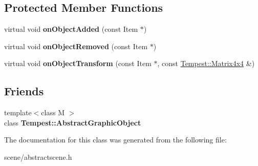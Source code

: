 \subsection*{Protected Member Functions}
\begin{DoxyCompactItemize}
\item 
\hypertarget{class_tempest_1_1_abstract_scene_a884fe6c22b0411cd2524ad56c479ab25}{virtual void {\bfseries on\+Object\+Added} (const Item $\ast$)}\label{class_tempest_1_1_abstract_scene_a884fe6c22b0411cd2524ad56c479ab25}

\item 
\hypertarget{class_tempest_1_1_abstract_scene_abf238d953a486566d561a8d7a6d89923}{virtual void {\bfseries on\+Object\+Removed} (const Item $\ast$)}\label{class_tempest_1_1_abstract_scene_abf238d953a486566d561a8d7a6d89923}

\item 
\hypertarget{class_tempest_1_1_abstract_scene_ad2628ef9b9b8c74da2d2353f30e900d5}{virtual void {\bfseries on\+Object\+Transform} (const Item $\ast$, const \hyperlink{class_tempest_1_1_matrix4x4}{Tempest\+::\+Matrix4x4} \&)}\label{class_tempest_1_1_abstract_scene_ad2628ef9b9b8c74da2d2353f30e900d5}

\end{DoxyCompactItemize}
\subsection*{Friends}
\begin{DoxyCompactItemize}
\item 
\hypertarget{class_tempest_1_1_abstract_scene_a3462d35d40dbded673b4160d2a4f9dc6}{{\footnotesize template$<$class M $>$ }\\class {\bfseries Tempest\+::\+Abstract\+Graphic\+Object}}\label{class_tempest_1_1_abstract_scene_a3462d35d40dbded673b4160d2a4f9dc6}

\end{DoxyCompactItemize}


The documentation for this class was generated from the following file\+:\begin{DoxyCompactItemize}
\item 
scene/abstractscene.\+h\end{DoxyCompactItemize}
